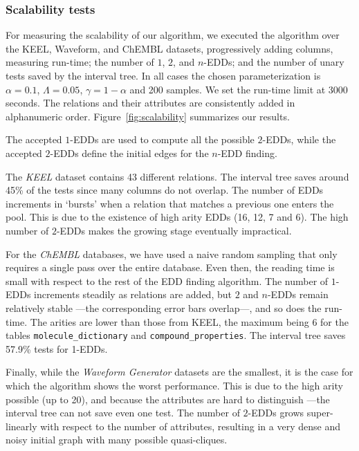 \subsubsection{Scalability tests}
\label{sec:scalability}

For measuring the scalability of our algorithm, we executed the algorithm over the KEEL, Waveform, and ChEMBL datasets, progressively adding columns, measuring run-time; the
number of $1$, $2$, and $n$-EDDs; and the number of unary tests saved by the interval
tree.
In all cases the chosen parameterization is $\alpha=0.1$, $\Lambda = 0.05$,
$\gamma = 1 - \alpha$ and 200 samples. We set the run-time limit at 3000 seconds.
The relations and their attributes are consistently added in alphanumeric order.
Figure~\ref{fig:scalability} summarizes our results.

The accepted $1$-EDDs are used to compute all the possible $2$-EDDs, while the accepted $2$-EDDs
define the initial edges for the $n$-EDD finding.


The \emph{KEEL} dataset contains 43 different relations. The interval tree saves around 45\% of
the tests since many columns do not overlap. The number of \glspl{EDD} increments in `bursts' when a
relation that matches a previous one enters the pool. This is due to the existence of
high arity \glspl{EDD} (16, 12, 7 and 6).
The high number of $2$-EDDs makes the growing stage eventually impractical.

For the \emph{ChEMBL} databases, we have used a naive random sampling that only requires a single
pass over the entire database. Even then, the reading time is small with respect to the rest of the EDD
finding algorithm. The number of $1$-EDDs increments steadily as relations are added, but $2$
and $n$-EDDs remain relatively stable ---the corresponding error bars overlap---, and so does the run-time.
The arities are lower than those from KEEL, the maximum being 6 for the tables \texttt{molecule\_dictionary}
and \texttt{compound\_properties}. The interval tree saves 57.9\% tests for 1-EDDs.

Finally, while the \emph{Waveform Generator} datasets are the smallest, it is the case for which the
algorithm shows the worst performance. This is due to the high arity possible (up to 20), and 
because the attributes are hard to distinguish ---the interval tree can not save even one test. The
number of $2$-EDDs grows super-linearly with respect to the number of attributes, resulting in a very
dense and noisy initial graph with many possible quasi-cliques.

